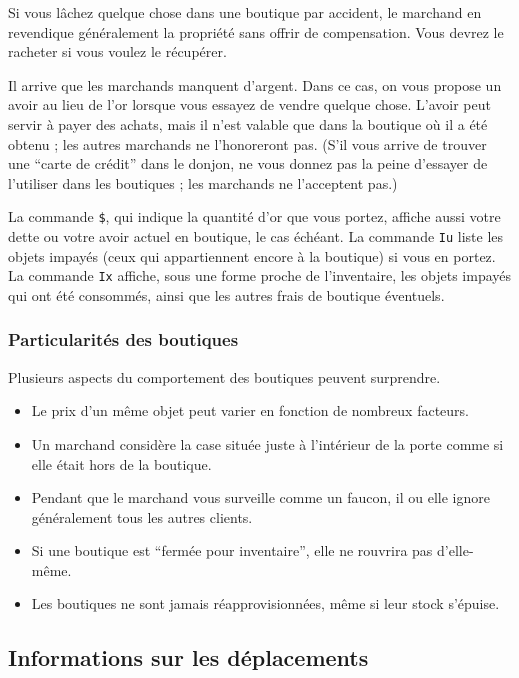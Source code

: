 \documentclass[titlepage]{article}
\begin{document}
Si vous lâchez quelque chose dans une boutique par accident, le marchand en
revendique généralement la propriété sans offrir de compensation.  Vous devrez
le racheter si vous voulez le récupérer.

Il arrive que les marchands manquent d'argent.
Dans ce cas, on vous
propose un avoir au lieu de l'or lorsque vous essayez de vendre quelque chose.
L'avoir peut servir à payer des achats, mais il n'est valable que dans la boutique
où il a été obtenu ; les autres marchands ne l'honoreront pas.
(S'il vous arrive de
trouver une ``carte de crédit'' dans le donjon, ne vous donnez pas la peine
d'essayer de l'utiliser dans les boutiques ; les marchands ne l'acceptent pas.)

La commande \texttt{\$}, qui indique la quantité d'or que vous portez,
affiche aussi votre dette ou votre avoir actuel en boutique, le cas échéant.
La commande \texttt{Iu} liste les objets impayés (ceux qui appartiennent encore à la
boutique) si vous en portez.
La commande \texttt{Ix} affiche, sous une forme proche de l'inventaire, les objets impayés
qui ont été consommés, ainsi que les autres frais de boutique éventuels.

\subsubsection*{Particularités des boutiques}

Plusieurs aspects du comportement des boutiques peuvent surprendre.

\begin{itemize}
\item
Le prix d'un même objet peut varier en fonction de nombreux facteurs.
\item
Un marchand considère la case située juste à l'intérieur de la porte comme si
elle était hors de la boutique.
\item
Pendant que le marchand vous surveille comme un faucon, il ou elle ignore
généralement tous les autres clients.
\item
Si une boutique est ``fermée pour inventaire'', elle ne rouvrira pas d'elle-même.
\item
Les boutiques ne sont jamais réapprovisionnées, même si leur stock s'épuise.
\end{itemize}

\subsection*{Informations sur les déplacements}
\end{document}
